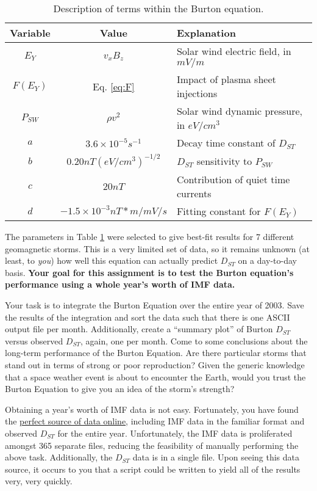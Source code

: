 \documentclass[12pt, letterpaper]{article}
\begin{document}
\begin{table}[!h]
  \begin{center}
    \begin{tabular}{c|c|l}
    Variable & Value & Explanation\\
    \hline\hline
    $E_Y$   & $v_x B_z$  & Solar wind electric field, in $mV/m$\\
    $F(E_Y)$ & Eq. \ref{eq:F} & Impact of plasma sheet injections\\
    $P_{SW}$ & $\rho v^2$ & Solar wind dynamic pressure, in $eV/cm^3$\\
    $a$ & $3.6\times 10^{-5}s^{-1}$ & Decay time constant of $D_{ST}$\\
    $b$ & $0.20nT(eV/cm^3)^{-1/2}$ & $D_{ST}$ sensitivity to $P_{SW}$\\
    $c$ & $20nT$ & Contribution of quiet time currents \\
    $d$ & $-1.5\times 10^{-3} nT*m/mV/s$ & Fitting constant for $F(E_Y)$\\
    \end{tabular}
    \caption{Description of terms within the Burton equation.}
    \label{tab:1}
  \end{center}
\end{table}

The parameters in Table \ref{tab:1} were selected to give best-fit results for
7 different geomagnetic storms.  This is a very limited set of data, so it
remains unknown (at least, to \emph{you}) how well this equation can actually
predict $D_{ST}$ on a day-to-day basis.
\textbf{Your goal for this assignment is to test the Burton equation's
  performance using a whole year's worth of IMF data.}

Your task is to integrate the Burton Equation over the entire year of 2003.
 Save the results of
the integration and sort the data such that there is one ASCII output file
per month.  Additionally, create a ``summary plot'' of Burton $D_{ST}$ versus
observed $D_{ST}$, again, one per month.  Come to some conclusions about
the long-term performance of the Burton Equation.  Are there particular storms
that stand out in terms of strong or poor reproduction?  Given the generic
knowledge that a space weather event is about to encounter the Earth, would
you trust the Burton Equation to give you an idea of the storm's strength?

Obtaining a year's worth of IMF data is not easy.
Fortunately, you have found the 
\href{http://www-personal.umich.edu/~dwelling/imf_2003/}
{perfect source of data online}, including IMF data in the familiar format
and observed $D_{ST}$ for the entire year.
Unfortunately, the IMF data is proliferated amongst 365 separate files, reducing
the feasibility of manually performing the above task.  Additionally, the 
$D_{ST}$ data is in a single file.  Upon seeing this data source, it occurs to
you that a script could be written to yield all of the results very, 
very quickly.
\end{document}
